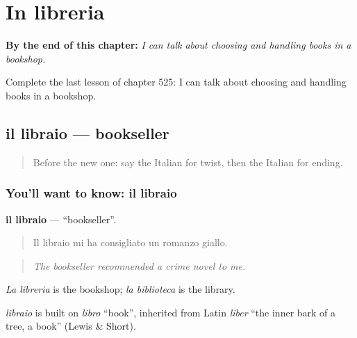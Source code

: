 
\chapter{In libreria}
\label{ch:it-in-libreria}

\begin{chapteropening}
\textbf{By the end of this chapter:} \emph{I can talk about choosing and handling books in a bookshop.}

Complete the last lesson of chapter 525: I can talk about choosing and handling books in a bookshop.
\end{chapteropening}

\section[il libraio]{il libraio — bookseller}

\label{lesson:IT-C525-libraio}



\begin{quote}
Before the new one: say the Italian for twist, then the Italian for ending.
\end{quote}

\subsection*{You'll want to know: il libraio}
\textbf{il libraio} — \textquotedblleft{}bookseller\textquotedblright{}.

\begin{quote}
Il libraio mi ha consigliato un romanzo giallo.
\end{quote}

\begin{quote}
\emph{The bookseller recommended a crime novel to me.}
\end{quote}

\emph{La libreria} is the bookshop; \emph{la biblioteca} is the library.

\begin{cousinweb}
\emph{libraio} is built on \emph{libro} \textquotedblleft{}book\textquotedblright{}, inherited from Latin \emph{liber} \textquotedblleft{}the inner bark of a tree, a book\textquotedblright{} (Lewis \& Short).
\end{cousinweb}

